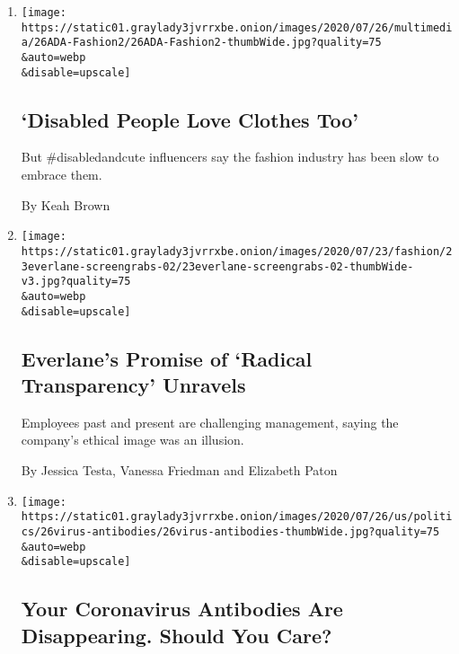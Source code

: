 \begin{enumerate}
\def\labelenumi{\arabic{enumi}.}
\item
  \href{/2020/07/26/style/functional-fashioin.html}{}

  \texttt{[image: https://static01.graylady3jvrrxbe.onion/images/2020/07/26/multimedia/26ADA-Fashion2/26ADA-Fashion2-thumbWide.jpg?quality=75\\\&auto=webp\\\&disable=upscale]}

  \hypertarget{disabled-people-love-clothes-too}{%
  \subsection{`Disabled People Love Clothes
  Too'}\label{disabled-people-love-clothes-too}}

  But \#disabledandcute influencers say the fashion industry has been
  slow to embrace them.

  By Keah Brown
\item
  \href{/2020/07/26/fashion/everlane-employees-ethical-clothing.html}{}

  \texttt{[image: https://static01.graylady3jvrrxbe.onion/images/2020/07/23/fashion/23everlane-screengrabs-02/23everlane-screengrabs-02-thumbWide-v3.jpg?quality=75\\\&auto=webp\\\&disable=upscale]}

  \hypertarget{everlanes-promise-of-radical-transparency-unravels}{%
  \subsection{Everlane's Promise of `Radical Transparency'
  Unravels}\label{everlanes-promise-of-radical-transparency-unravels}}

  Employees past and present are challenging management, saying the
  company's ethical image was an illusion.

  By Jessica Testa, Vanessa Friedman and Elizabeth Paton
\item
  \href{/2020/07/26/health/coronvirus-antibody-tests.html}{}

  \texttt{[image: https://static01.graylady3jvrrxbe.onion/images/2020/07/26/us/politics/26virus-antibodies/26virus-antibodies-thumbWide.jpg?quality=75\\\&auto=webp\\\&disable=upscale]}

  \hypertarget{your-coronavirus-antibodies-are-disappearing-should-you-care}{%
  \subsection{Your Coronavirus Antibodies Are Disappearing. Should You
  Care?}\label{your-coronavirus-antibodies-are-disappearing-should-you-care}}


\end{enumerate}
